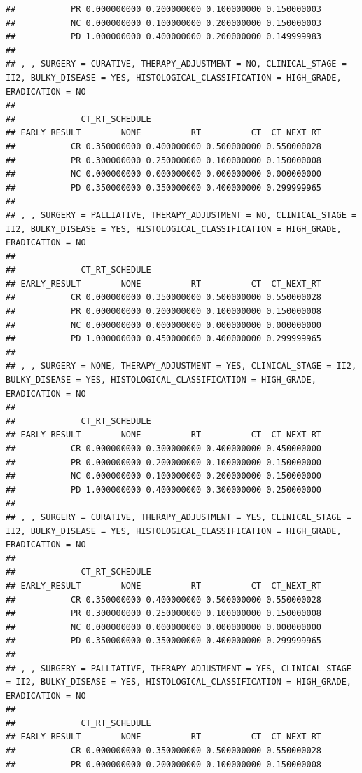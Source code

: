 \documentclass[]{article}
\begin{document}
\begin{verbatim}
##           PR 0.000000000 0.200000000 0.100000000 0.150000003
##           NC 0.000000000 0.100000000 0.200000000 0.150000003
##           PD 1.000000000 0.400000000 0.200000000 0.149999983
## 
## , , SURGERY = CURATIVE, THERAPY_ADJUSTMENT = NO, CLINICAL_STAGE = II2, BULKY_DISEASE = YES, HISTOLOGICAL_CLASSIFICATION = HIGH_GRADE, ERADICATION = NO
## 
##             CT_RT_SCHEDULE
## EARLY_RESULT        NONE          RT          CT  CT_NEXT_RT
##           CR 0.350000000 0.400000000 0.500000000 0.550000028
##           PR 0.300000000 0.250000000 0.100000000 0.150000008
##           NC 0.000000000 0.000000000 0.000000000 0.000000000
##           PD 0.350000000 0.350000000 0.400000000 0.299999965
## 
## , , SURGERY = PALLIATIVE, THERAPY_ADJUSTMENT = NO, CLINICAL_STAGE = II2, BULKY_DISEASE = YES, HISTOLOGICAL_CLASSIFICATION = HIGH_GRADE, ERADICATION = NO
## 
##             CT_RT_SCHEDULE
## EARLY_RESULT        NONE          RT          CT  CT_NEXT_RT
##           CR 0.000000000 0.350000000 0.500000000 0.550000028
##           PR 0.000000000 0.200000000 0.100000000 0.150000008
##           NC 0.000000000 0.000000000 0.000000000 0.000000000
##           PD 1.000000000 0.450000000 0.400000000 0.299999965
## 
## , , SURGERY = NONE, THERAPY_ADJUSTMENT = YES, CLINICAL_STAGE = II2, BULKY_DISEASE = YES, HISTOLOGICAL_CLASSIFICATION = HIGH_GRADE, ERADICATION = NO
## 
##             CT_RT_SCHEDULE
## EARLY_RESULT        NONE          RT          CT  CT_NEXT_RT
##           CR 0.000000000 0.300000000 0.400000000 0.450000000
##           PR 0.000000000 0.200000000 0.100000000 0.150000000
##           NC 0.000000000 0.100000000 0.200000000 0.150000000
##           PD 1.000000000 0.400000000 0.300000000 0.250000000
## 
## , , SURGERY = CURATIVE, THERAPY_ADJUSTMENT = YES, CLINICAL_STAGE = II2, BULKY_DISEASE = YES, HISTOLOGICAL_CLASSIFICATION = HIGH_GRADE, ERADICATION = NO
## 
##             CT_RT_SCHEDULE
## EARLY_RESULT        NONE          RT          CT  CT_NEXT_RT
##           CR 0.350000000 0.400000000 0.500000000 0.550000028
##           PR 0.300000000 0.250000000 0.100000000 0.150000008
##           NC 0.000000000 0.000000000 0.000000000 0.000000000
##           PD 0.350000000 0.350000000 0.400000000 0.299999965
## 
## , , SURGERY = PALLIATIVE, THERAPY_ADJUSTMENT = YES, CLINICAL_STAGE = II2, BULKY_DISEASE = YES, HISTOLOGICAL_CLASSIFICATION = HIGH_GRADE, ERADICATION = NO
## 
##             CT_RT_SCHEDULE
## EARLY_RESULT        NONE          RT          CT  CT_NEXT_RT
##           CR 0.000000000 0.350000000 0.500000000 0.550000028
##           PR 0.000000000 0.200000000 0.100000000 0.150000008

\end{verbatim}
\end{document}
